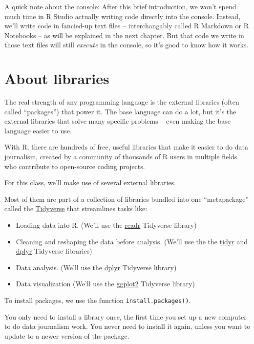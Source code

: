\documentclass[
  letterpaper,
  DIV=11,
  numbers=noendperiod]{scrreprt}
\providecommand{\tightlist}{%
  \setlength{\itemsep}{0pt}\setlength{\parskip}{0pt}}\usepackage{longtable,booktabs,array}
\begin{document}
A quick note about the console: After this brief introduction, we won't
spend much time in R Studio actually writing code directly into the
console. Instead, we'll write code in fancied-up text files --
interchangably called R Markdown or R Notebooks -- as will be explained
in the next chapter. But that code we write in those text files will
still \emph{execute} in the console, so it's good to know how it works.

\hypertarget{about-libraries}{%
\section{About libraries}\label{about-libraries}}

The real strength of any programming language is the external libraries
(often called ``packages'') that power it. The base language can do a
lot, but it's the external libraries that solve many specific problems
-- even making the base language easier to use.

With R, there are hundreds of free, useful libraries that make it easier
to do data journalism, created by a community of thousands of R users in
multiple fields who contribute to open-source coding projects.

For this class, we'll make use of several external libraries.

Most of them are part of a collection of libraries bundled into one
``metapackage'' called the
\href{https://www.tidyverse.org/packages/}{Tidyverse} that streamlines
tasks like:

\begin{itemize}
\tightlist
\item
  Loading data into R. (We'll use the
  \href{https://readr.tidyverse.org/}{readr} Tidyverse library)
\item
  Cleaning and reshaping the data before analysis. (We'll use the the
  \href{https://tidyr.tidyverse.org/index.html}{tidyr} and
  \href{https://dplyr.tidyverse.org/}{dplyr} Tidyverse libraries)
\item
  Data analysis. (We'll use the
  \href{https://dplyr.tidyverse.org/}{dplyr} Tidyverse library)
\item
  Data visualization (We'll use the
  \href{https://ggplot2.tidyverse.org/}{ggplot2} Tidyverse library)
\end{itemize}

To install packages, we use the function \texttt{install.packages()}.

You only need to install a library once, the first time you set up a new
computer to do data journalism work. You never need to install it again,
unless you want to update to a newer version of the package.
\end{document}
